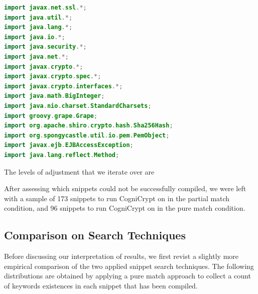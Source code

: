 \documentclass[10pt, conference]{IEEEtran}
\begin{document}
\begin{lstlisting}[language=java]
import javax.net.ssl.*;                                                                        
import java.util.*;                                                                                     
import java.lang.*;                                                                                     
import java.io.*;                                                                                       
import java.security.*;                                                                                 
import java.net.*;                                                                                      
import javax.crypto.*;
import javax.crypto.spec.*;
import javax.crypto.interfaces.*;
import java.math.BigInteger;                                                                            
import java.nio.charset.StandardCharsets;                                                               
import groovy.grape.Grape;                                                                              
import org.apache.shiro.crypto.hash.Sha256Hash;                                                         
import org.spongycastle.util.io.pem.PemObject;                                                          
import javax.ejb.EJBAccessException;                                                                    
import java.lang.reflect.Method;
\end{lstlisting}


The levels of adjustment that we iterate over are 

After assessing which snippets could not be successfully compiled, we were left with a sample of 173 snippets to run CogniCrypt on in the partial match condition, and 96 snippets to run CogniCrypt on in the pure match condition. 


\subsection{Comparison on Search Techniques}
Before discussing our interpretation of results, we first revist a slightly more empirical comparison of the two applied snippet search techniques. The following distributions are obtained by applying a pure match approach to collect a count of keywords existences in each snippet that has been compiled.
\end{document}
